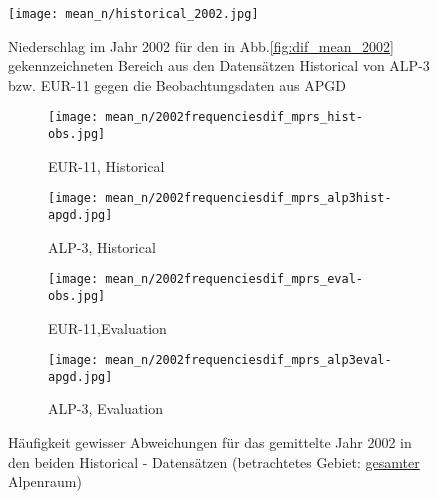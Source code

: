\begin{figure}[b]
	\texttt{[image: mean\_n/historical\_2002.jpg]}
	\caption{Niederschlag im Jahr 2002 für den in Abb.\ref{fig:dif_mean_2002} gekennzeichneten Bereich aus den Datensätzen Historical von ALP-3 bzw. EUR-11 gegen die Beobachtungsdaten aus APGD}
	\label{fig:precip_2002}
\end{figure}
\begin{figure}[b]
	\begin{subfigure}{0.49\textwidth}
		\texttt{[image: mean\_n/2002frequenciesdif\_mprs\_hist-obs.jpg]}
		\caption{EUR-11, Historical}
	\end{subfigure}
	\begin{subfigure}{0.49\textwidth}
		\texttt{[image: mean\_n/2002frequenciesdif\_mprs\_alp3hist-apgd.jpg]}
		\caption{ALP-3, Historical}
	\end{subfigure}
	\begin{subfigure}{0.49\textwidth}
		\texttt{[image: mean\_n/2002frequenciesdif\_mprs\_eval-obs.jpg]}
		\caption{EUR-11,Evaluation}
	\end{subfigure}
	\begin{subfigure}{0.49\textwidth}
		\texttt{[image: mean\_n/2002frequenciesdif\_mprs\_alp3eval-apgd.jpg]}
		\caption{ALP-3, Evaluation}
	\end{subfigure}
	\caption{Häufigkeit gewisser Abweichungen für das gemittelte Jahr 2002 in den beiden Historical - Datensätzen (betrachtetes Gebiet: \underline{gesamter} Alpenraum)}
	\label{fig:freq_2002}
\end{figure}

